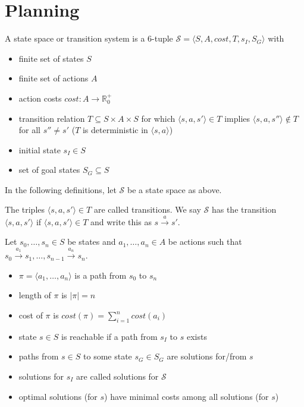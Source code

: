 \section{Planning}

\begin{definition}
    A state space or transition system is a 6-tuple $\mathcal S = \langle S, A, \textit{cost}, T, s_I, S_G \rangle$ with
    \begin{itemize}
        \item finite set of states $S$
        \item finite set of actions $A$
        \item action costs $\textit{cost}: A \rightarrow \mathbb R_0^+$
        \item transition relation $T \subseteq S \times A \times S$ for which $\langle s, a, s' \rangle \in T$ implies $\langle s, a, s'' \rangle \notin T$ for all $s'' \neq s'$ ($T$ is deterministic in $\langle s, a \rangle$)
        \item initial state $s_I \in S$
        \item set of goal states $S_G \subseteq S$
    \end{itemize}
\end{definition}
In the following definitions, let $\mathcal S$ be a state space as above.
\begin{definition}
    The triples $\langle s, a, s' \rangle \in T$ are called transitions. We say $\mathcal S$ has the transition $\langle s, a, s' \rangle$ if $\langle s, a, s' \rangle \in T$ and write this as $s \stackrel{a}{\rightarrow} s'$.
\end{definition}
\begin{definition}
    Let $s_0, \ldots, s_n \in S$ be states and $a_1, \ldots, a_n \in A$ be actions such that $s_0 \stackrel{a_1}{\rightarrow} s_1, \ldots, s_{n-1} \stackrel{a_n}{\rightarrow} s_n$.
    \begin{itemize}
        \item $\pi = \langle a_1, \ldots, a_n \rangle$ is a path from $s_0$ to $s_n$
        \item length of $\pi$ is $\lvert \pi \rvert = n$
        \item cost of $\pi$ is $\textit{cost}(\pi) = \sum_{i=1}^{n} \textit{cost}(a_i)$
    \end{itemize}
\end{definition}
\begin{definition}
    \begin{itemize}
        \item state $s \in S$ is reachable if a path from $s_I$ to $s$ exists
        \item paths from $s \in S$ to some state $s_G \in S_G$ are solutions for/from $s$
        \item solutions for $s_I$ are called solutions for $\mathcal S$
        \item optimal solutions (for $s$) have minimal costs among all solutions (for $s$)
    \end{itemize}
\end{definition}



